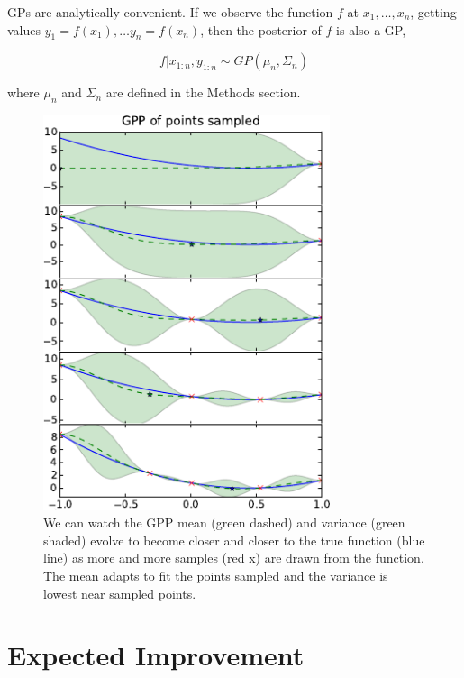 \documentclass[phd,tocprelim]{cornell}
\begin{document}
GPs are analytically convenient. If we observe the function $f$ at $x_{1}, \ldots, x_{n}$, getting values $y_{1} = f(x_{1}), \ldots y_{n} = f(x_{n})$, then the posterior of $f$ is also a GP,

\begin{equation}
 f|x_{1:n}, y_{1:n} \sim GP(\mu_{n}, \Sigma_{n})
\end{equation}

where $\mu_{n}$ and $\Sigma_{n}$ are defined in the Methods section.

\begin{figure}[hpt]
 	\centerline{\includegraphics[width=0.75\textwidth]{figures/EPI/GPP_stepper_EI.png}}
    \caption[Evolution of a GPP]{We can watch the GPP mean (green dashed) and variance (green shaded) evolve to become closer and closer to the true function (blue line) as more and more samples (red x) are drawn from the function. The mean adapts to fit the points sampled and the variance is lowest near sampled points.}
 	\label{fig:GPP_evolve}
\end{figure}

\section{Expected Improvement}
\end{document}

